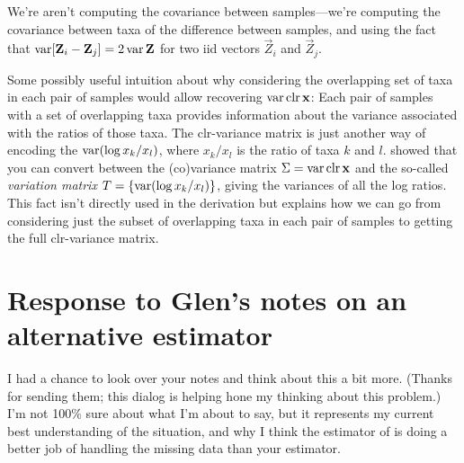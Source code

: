 We're aren't computing the covariance between samples---we're computing the
covariance between taxa of the difference between samples, and using the fact
that $\operatorname{var} [\mathbf{Z}_i - \mathbf{Z}_j] = 2 \operatorname{var} \mathbf{Z}$ for two iid vectors $\vec
Z_i$ and $\vec Z_j$. 

Some possibly useful intuition about why considering the overlapping set of
taxa in each pair of samples would allow recovering $\operatorname{var} \operatorname{clr} \mathbf{x}$: Each
pair of samples with a set of overlapping taxa provides information about the
variance associated with the ratios of those taxa. The clr-variance matrix is
just another way of encoding the $\operatorname{var}(\log x_k/x_l)$, where $x_k/x_l$ is the
ratio of taxa $k$ and $l$. \textcite{Aitchison1986} showed that you can convert
between the (co)variance matrix $\Sigma = \operatorname{var} \operatorname{clr} \mathbf{x}$ and the so-called
\emph{variation matrix} $T = \{\operatorname{var}(\log x_k/x_l)\}$, giving the variances of
all the log ratios. This fact isn't directly used in the derivation but
explains how we can go from considering just the subset of overlapping taxa in
each pair of samples to getting the full clr-variance matrix.


\section{Response to Glen's notes on an alternative estimator}

%

I had a chance to look over your notes and think about this a bit more. (Thanks
for sending them; this dialog is helping hone my thinking about this problem.)
I'm not 100\% sure about what I'm about to say, but it represents my current
best understanding of the situation, and why I think the estimator of
\textcite{vandenBoogaart2006} is doing a better job of handling the missing
data than your estimator.

